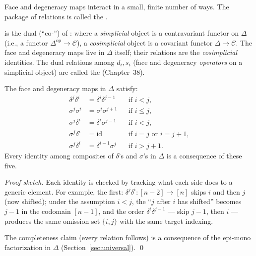 Face and degeneracy maps interact in a small, finite number of ways. The
package of relations is called the .

\begin{nameorigin}
 is the dual (``co-'') of : where a
\emph{simplicial} object is a contravariant functor on $\Delta$ (i.e., a
functor $\Delta^{\mathrm{op}} \to \mathcal{C}$), a \emph{cosimplicial}
object is a covariant functor $\Delta \to \mathcal{C}$. The face and
degeneracy maps live in $\Delta$ itself; their relations are the
\emph{cosimplicial} identities. The dual relations among $d_i, s_i$
(face and degeneracy \emph{operators} on a simplicial object) are
called the  (Chapter~38).
\end{nameorigin}

\begin{theorem}
\label{thm:cosimplicial-identities}
The face and degeneracy maps in $\Delta$ satisfy:
\begin{align*}
  \delta^j \delta^i &= \delta^i \delta^{j-1}      & & \text{if } i < j, \\
  \sigma^j \sigma^i &= \sigma^i \sigma^{j+1}      & & \text{if } i \leq j, \\
  \sigma^j \delta^i &= \delta^i \sigma^{j-1}      & & \text{if } i < j, \\
  \sigma^j \delta^i &= \mathrm{id}                 & & \text{if } i = j \text{ or } i = j+1, \\
  \sigma^j \delta^i &= \delta^{i-1} \sigma^j      & & \text{if } i > j+1.
\end{align*}
Every identity among composites of $\delta$'s and $\sigma$'s in $\Delta$
is a consequence of these five.
\end{theorem}

\begin{proof}[Proof sketch]
Each identity is checked by tracking what each side does to a generic
element. For example, the first: $\delta^j \delta^i : [n-2] \to [n]$
skips $i$ and then $j$ (now shifted); under the assumption $i < j$, the
``$j$ after $i$ has shifted'' becomes $j-1$ in the codomain $[n-1]$, and
the order $\delta^i \delta^{j-1}$ — skip $j-1$, then $i$ — produces the
same omission set $\{i, j\}$ with the same target indexing.

The completeness claim (every relation follows) is a consequence of the
epi-mono factorization in $\Delta$ (Section~\ref{sec:universal}).
\qed
\end{proof}


